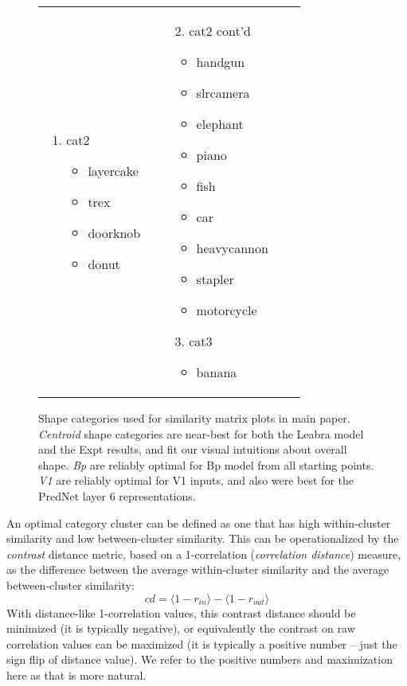 \documentclass[12pt,twoside]{article}
\newif\myifpdf
\begin{document}
\begin{figure}
\begin{tabular}{llll}
{\begin{enumerate}
\begin{itemize}
	\item tablelamp
	\item chair
	\end{itemize}
	\item cat2
	\begin{itemize}
	\item layercake
	\item trex
	\item doorknob
	\item donut
	\end{itemize}
	\end{enumerate}
	} & 
	 \parbox[t]{1.7in}{\raggedright 	\baselineskip0pt
	\begin{enumerate}
	\item[2.] cat2 cont'd
	\begin{itemize}
	\item handgun
	\item slrcamera
	\item elephant
	\item piano
	\item fish
	\item car
	\item heavycannon
	\item stapler
	\item motorcycle
	\end{itemize}
	\item[3.] cat3
	\begin{itemize}
	\item banana
	\end{itemize}
	\end{enumerate}
	}\\
	\end{tabular}
	\caption{Shape categories used for similarity matrix plots in main paper.  {\em Centroid} shape categories are near-best for both the Leabra model and the Expt results, and fit our visual intuitions about overall shape. {\em Bp} are reliably optimal for Bp model from all starting points.  {\em V1} are reliably optimal for V1 inputs, and also were best for the PredNet layer 6 representations.}
	\label{fig.cats}
\end{figure}

An optimal category cluster can be defined as one that has high within-cluster similarity and low between-cluster similarity.  This can be operationalized by the {\em contrast} distance metric, based on a 1-correlation ({\em correlation distance}) measure, as the difference between the average within-cluster similarity and the average between-cluster similarity:
\begin{equation}
 cd = \langle 1-r_{in} \rangle - \langle 1-r_{out} \rangle 
\end{equation}
With distance-like 1-correlation values, this contrast distance should be minimized (it is typically negative), or equivalently the contrast on raw correlation values can be maximized (it is typically a positive number -- just the sign flip of distance value).  We refer to the positive numbers and maximization here as that is more natural.
\end{document}
